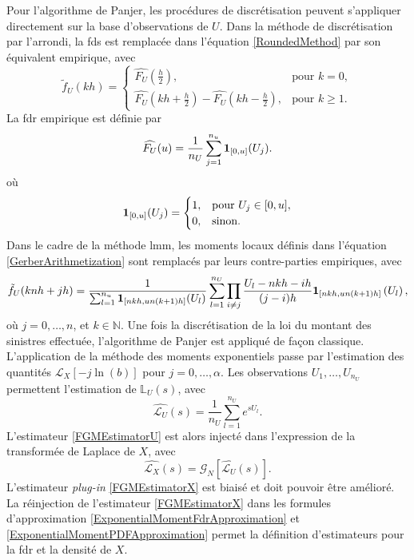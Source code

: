 Pour l'algorithme de Panjer, les procédures de discrétisation peuvent s'appliquer directement sur la base d'observations de $U$. Dans la méthode de discrétisation par l'arrondi, la \gls{fds} est remplacée dans l'équation \eqref{RoundedMethod} par son équivalent empirique, avec
\begin{equation}\label{RoundedMethodStatitical}
\tilde{f}_{U}(kh)=
\begin{cases} 
\widehat{F_{U}}\left(\frac{h}{2}\right), &\mbox{pour } k = 0, \\ 
\widehat{F_{U}}\left(kh+\frac{h}{2}\right) - \widehat{F_{U}}\left(kh-\frac{h}{2}\right),& \mbox{pour } k \geq 1. \end{cases}
\end{equation} 
La \gls{fdr} empirique est définie par 
\begin{equation}\label{EmpiricalCDF}
\widehat{F_{U}}(u)=\frac{1}{n_{U}}\sum_{j=1}^{n_{u}}\bold{1}_{[0,u]}(U_{j}).
\end{equation}
où
\begin{equation}\label{RoundedMethodStatitical}
\bold{1}_{[0,u]}(U_{j})=
\begin{cases} 
1, &\mbox{pour } U_{j}\in[0,u],\\ 
0,& \mbox{sinon. }\end{cases}
\end{equation} 
Dans le cadre de la méthode \gls{lmm}, les moments locaux définis dans l'équation \eqref{GerberArithmetization} sont remplacés par leurs contre-parties empiriques, avec
\begin{equation}\label{GerberArithmetization}
\tilde{f}_{U}(knh+jh)=\frac{1}{\sum_{l=1}^{n_{u}}\bold{1}_{[nkh,un(k+1)h]}(U_{l})}\sum_{l=1}^{n_{U}}\prod_{i\neq j}\frac{U_{l}-nkh-ih}{(j-i)h}\bold{1}_{[nkh,un(k+1)h]}\left(U_{l}\right),
\end{equation}  
où $j=0,\ldots,n$, et  $k\in\mathbb{N}$. Une fois la discrétisation de la loi du montant des sinistres effectuée, l'algorithme de Panjer est appliqué de façon classique.\\

L'application de la méthode des moments exponentiels passe par l'estimation des quantités $\mathcal{L}_{X}\left[-j\ln(b)\right]$ pour $j=0,\ldots,\alpha$. Les observations $U_{1},\ldots,U_{n_{U}}$ permettent l'estimation de $\mathbb{L}_{U}(s)$, avec 
\begin{equation}\label{FGMEstimatorU}
\widehat{\mathcal{L}_{U}}(s)=\frac{1}{n_{U}}\sum_{l=1}^{n_{U}}e^{sU_{l}}. 
\end{equation}
L'estimateur \eqref{FGMEstimatorU} est alors injecté dans l'expression de la transformée de Laplace de $X$, avec 
\begin{equation}\label{FGMEstimatorX}
\widehat{\mathcal{L}_{X}}(s)=\mathcal{G}_{N}\left[\widehat{\mathcal{L}_{U}}(s)\right].
\end{equation}
L'estimateur \textit{plug-in} \eqref{FGMEstimatorX} est biaisé et doit pouvoir être amélioré. La réinjection de l'estimateur \eqref{FGMEstimatorX} dans les formules d'approximation \eqref{ExponentialMomentFdrApproximation} et \eqref{ExponentialMomentPDFApproximation} permet la définition d'estimateurs pour la \gls{fdr} et la densité de $X$.\\

